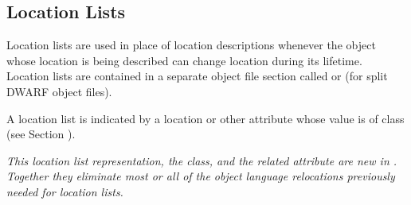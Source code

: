 \subsection{Location Lists}
\label{chap:locationlists}
Location lists are used in place of location descriptions whenever
the object whose location is being described can change location
during its lifetime. Location lists are contained in a separate
object file section called \dotdebugloclists{} or \dotdebugloclistsdwo{}
(for split DWARF object files).

A location list is indicated by a location or other attribute
whose value is of class \CLASSloclist{} 
(see Section ).
   
\textit{This location list representation, the \CLASSloclist{} class, and the
related \DWATloclistsbase{} attribute are new in \DWARFVersionV.
Together they eliminate most or all of the object language relocations
previously needed for location lists.}

